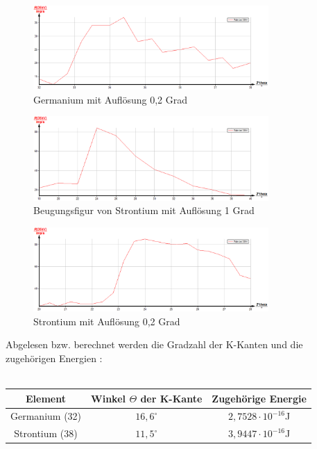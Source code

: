 \begin{figure}[H]
\includegraphics[width=0.8\textwidth] {pics/germanium02.png}
\centering
\caption{Germanium mit Auflösung 0,2 Grad}
\label{Aufbau}
\end{figure}

\begin{figure}[H]
\includegraphics[width=0.8\textwidth] {pics/strontium01.png}
\centering
\caption{Beugungsfigur von Strontium mit Auflösung 1 Grad}
\label{Aufbau}
\end{figure}

\begin{figure}[H]
\includegraphics[width=0.8\textwidth] {pics/strontium02.png}
\centering
\caption{Strontium mit Auflösung 0,2 Grad}
\label{Aufbau}
\end{figure}

Abgelesen bzw. berechnet werden die Gradzahl der K-Kanten und die zugehörigen Energien :\\ \\
\begin{tabular}{|c|c|c|}
\hline 
Element & Winkel $\Theta$ der K-Kante & Zugehörige Energie \\ 
\hline 
Germanium (32) & $16,6^\circ$ & $2,7528\cdot10^{-16}$J \\ 
\hline 
Strontium (38) & $11,5^\circ$ & $3,9447\cdot10^{-16}$J \\ 
\hline 
\end{tabular} 

